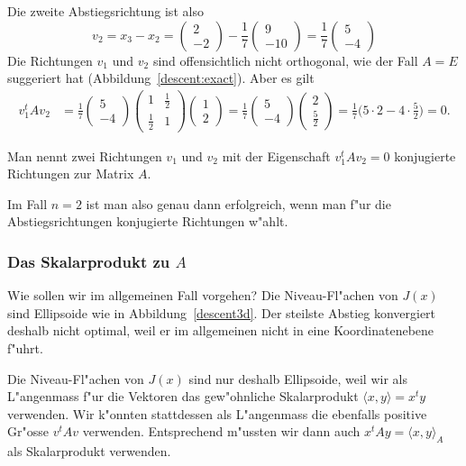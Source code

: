 Die zweite Abstiegsrichtung ist also
\[
v_2=
x_3-x_2
=\begin{pmatrix}2\\-2\end{pmatrix}-
\frac17\begin{pmatrix}9\\-10\end{pmatrix}
=
\frac17\begin{pmatrix}5\\-4\end{pmatrix}
\]
Die Richtungen $v_1$ und $v_2$ sind offensichtlich nicht orthogonal,
wie der Fall $A=E$ suggeriert hat (Abbildung~\ref{descent:exact}).
Aber es gilt
\begin{align}
v_1^tAv_2
&=
\frac17\begin{pmatrix}5\\-4\end{pmatrix}
\begin{pmatrix}
1&\frac12\\
\frac12&1
\end{pmatrix}
\begin{pmatrix}1\\2\end{pmatrix}
=
\frac17\begin{pmatrix}5\\-4\end{pmatrix}
\begin{pmatrix}2\\\frac52\end{pmatrix}
=\frac17\biggl(5\cdot 2-4\cdot\frac52\biggr)=0.
\label{descent:ortho}
\end{align}
\begin{definition}
Man nennt zwei Richtungen $v_1$ und $v_2$ mit der Eigenschaft
$v_1^tAv_2=0$ konjugierte Richtungen zur Matrix $A$.
\end{definition}
Im Fall $n=2$ ist man also genau dann erfolgreich, wenn man f"ur
die Abstiegsrichtungen konjugierte Richtungen w"ahlt.

\subsubsection{Das Skalarprodukt zu $A$}
Wie sollen wir im allgemeinen Fall vorgehen?
Die Niveau-Fl"achen von $J(x)$ sind Ellipsoide wie in Abbildung~\ref{descent3d}.
Der steilste Abstieg konvergiert deshalb nicht optimal, weil er 
im allgemeinen nicht in eine Koordinatenebene f"uhrt.

Die Niveau-Fl"achen von $J(x)$ sind nur deshalb Ellipsoide, weil
wir als L"angenmass f"ur die Vektoren das gew"ohnliche Skalarprodukt
$\langle x,y\rangle = x^ty$ verwenden. 
Wir k"onnten stattdessen als L"angenmass die ebenfalls positive
Gr"osse $v^tAv$ verwenden.
Entsprechend m"ussten wir dann auch $x^tAy=\langle x,y\rangle_A$ als
Skalarprodukt verwenden. 

